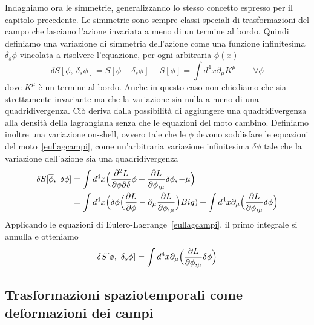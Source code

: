     Indaghiamo ora le simmetrie, generalizzando lo stesso concetto espresso per il capitolo precedente. Le simmetrie sono sempre classi speciali di trasformazioni del campo che lasciano l'azione invariata a meno di un termine al bordo. Quindi definiamo una variazione di simmetria dell'azione come una funzione infinitesima $\delta_s \phi$ vincolata a risolvere l'equazione, per ogni arbitraria $\phi(x)$
    \begin{equation} \label{invazionecampi}
        \delta S[\phi, ~\delta_s \phi] = S[\phi + \delta_s \phi] - S[\phi] = \int d^4 x \partial_\mu K^\mu \qquad \forall \phi
    \end{equation}  
    dove $K^\mu$ è un termine al bordo. Anche in questo caso non chiediamo che sia strettamente invariante ma che la variazione sia nulla a meno di una quadridivergenza. Ciò deriva dalla possibilità di aggiungere una quadridivergenza alla densità della lagrangiana senza che le equazioni del moto cambino. Definiamo inoltre una variazione on-shell, ovvero tale che le $\phi$ devono soddisfare le equazioni del moto~\eqref{eullagcampi}, come un'arbitraria variazione infinitesima $\delta \phi$ tale che la variazione dell'azione sia una quadridivergenza
    \begin{equation*}
    \begin{aligned}
        \delta S[\overline \phi, ~\delta \phi] & = \int d^4 x \Big(\frac{\partial^2 L}{\partial\phi \partial\delta} \phi + \frac{\partial L}{\partial\phi,_\mu} \delta \phi,-\mu \Big) \\ & = \int d^4 x \Big ( \delta \phi \Big (\frac{\partial L}{\partial\phi} - \partial_\mu \frac{\partial L}{\partial\phi,_\mu} \Big ) Big) + \int d^4 x \partial_\mu \Big ( \frac{\partial L}{\partial\phi,_\mu}  \delta \phi \Big)
    \end{aligned}
    \end{equation*}
    Applicando le equazioni di Eulero-Lagrange~\eqref{eullagcampi}, il primo integrale si annulla e otteniamo 
    \begin{equation} \label{invonshellcampi}
        \delta S[\phi, ~\delta_s \phi] = \int d^4 x \partial_\mu \Big ( \frac{\partial L}{\partial\phi,_\mu}  \delta \phi \Big)
    \end{equation}

\subsection{Trasformazioni spaziotemporali come deformazioni dei campi}

